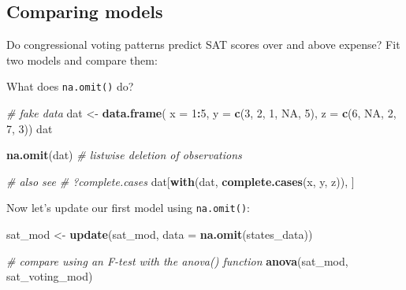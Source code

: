 \documentclass[]{book}
\newenvironment{Shaded}{\begin{snugshade}}{\end{snugshade}}
\newcommand{\KeywordTok}[1]{\textcolor[rgb]{0.13,0.29,0.53}{\textbf{#1}}}
\newcommand{\DataTypeTok}[1]{\textcolor[rgb]{0.13,0.29,0.53}{#1}}
\newcommand{\DecValTok}[1]{\textcolor[rgb]{0.00,0.00,0.81}{#1}}
\newcommand{\StringTok}[1]{\textcolor[rgb]{0.31,0.60,0.02}{#1}}
\newcommand{\CommentTok}[1]{\textcolor[rgb]{0.56,0.35,0.01}{\textit{#1}}}
\newcommand{\OtherTok}[1]{\textcolor[rgb]{0.56,0.35,0.01}{#1}}
\newcommand{\OperatorTok}[1]{\textcolor[rgb]{0.81,0.36,0.00}{\textbf{#1}}}
\newcommand{\NormalTok}[1]{#1}
\begin{document}
\subsection{Comparing models}\label{comparing-models}

Do congressional voting patterns predict SAT scores over and above
expense? Fit two models and compare them:

\begin{Shaded}
\end{Shaded}

What does \texttt{na.omit()} do?

\begin{Shaded}
\begin{Highlighting}[]
\CommentTok{# fake data}
\NormalTok{dat <-}\StringTok{ }\KeywordTok{data.frame}\NormalTok{(}
  \DataTypeTok{x =} \DecValTok{1}\OperatorTok{:}\DecValTok{5}\NormalTok{, }
  \DataTypeTok{y =} \KeywordTok{c}\NormalTok{(}\DecValTok{3}\NormalTok{, }\DecValTok{2}\NormalTok{, }\DecValTok{1}\NormalTok{, }\OtherTok{NA}\NormalTok{, }\DecValTok{5}\NormalTok{), }
  \DataTypeTok{z =} \KeywordTok{c}\NormalTok{(}\DecValTok{6}\NormalTok{, }\OtherTok{NA}\NormalTok{, }\DecValTok{2}\NormalTok{, }\DecValTok{7}\NormalTok{, }\DecValTok{3}\NormalTok{))}
\NormalTok{dat}

\KeywordTok{na.omit}\NormalTok{(dat) }\CommentTok{# listwise deletion of observations}

\CommentTok{# also see}
\CommentTok{# ?complete.cases}
\NormalTok{dat[}\KeywordTok{with}\NormalTok{(dat, }\KeywordTok{complete.cases}\NormalTok{(x, y, z)), ]}
\end{Highlighting}
\end{Shaded}

Now let's update our first model using \texttt{na.omit()}:

\begin{Shaded}
\begin{Highlighting}[]
\NormalTok{  sat_mod <-}\StringTok{ }\KeywordTok{update}\NormalTok{(sat_mod, }\DataTypeTok{data =} \KeywordTok{na.omit}\NormalTok{(states_data))}

  \CommentTok{# compare using an F-test with the anova() function}
  \KeywordTok{anova}\NormalTok{(sat_mod, sat_voting_mod)}
\end{Highlighting}
\end{Shaded}
\end{document}
